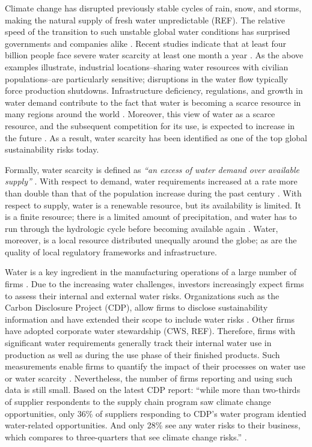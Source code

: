 \documentclass[a4paper]{article}
\begin{document}
Climate change has disrupted previously stable cycles of rain, snow, and storms, making the natural supply of fresh water unpredictable (REF). 
The relative speed of the transition to such unstable global water conditions has surprised governments and companies alike \citep{Schneider:2016}.
Recent studies indicate that at least four billion people face severe water scarcity at least one month a year \citep{Mekonnen:2016}.
As the above examples illustrate, industrial locations--sharing water resources with civilian populations--are particularly sensitive; disruptions in the water flow typically force production shutdowns.
Infrastructure deficiency, regulations, and growth in water demand contribute to the fact that water is becoming a scarce resource in many regions around the world \citep{OECD:2011, Schyns:2015}. 
Moreover, this view of water as a scarce resource, and the subsequent competition for its use, is expected to increase in the future \citep{Hoekstra:2014, WEF:2015}.
As a result, water scarcity has been identified as one of the top global sustainability risks today. 

Formally, water scarcity is defined as \textit{``an excess of water demand over available supply''} \citep[][p.xx]{Steduto:2012}.
With respect to demand, water requirements increased at a rate more than double than that of the population increase during the past century \citep{Zabarenko:2011}.
With respect to supply, water is a renewable resource, but its availability is limited. 
It is a finite resource; there is a limited amount of precipitation, and water has to run through the hydrologic cycle before becoming available again \citep{Hoekstra:2013,Schyns:2015}.
Water, moreover, is a local resource distributed unequally around the globe; as are the quality of local regulatory frameworks and infrastructure. 

Water is a key ingredient in the manufacturing operations of a large number of firms \citep{Jones:2014}. 
Due to the increasing water challenges, investors increasingly expect firms to assess their internal and external water risks. 
Organizations such as the Carbon Disclosure Project (CDP), allow firms to disclose sustainability information and have extended their scope to include water risks \citep{CDP:2015}.
Other firms have adopted corporate water stewardship (CWS, REF).
Therefore, firms with significant water requirements generally track their internal water use in production as well as during the use phase of their finished products.
Such measurements enable firms to quantify the impact of their processes on water use \citep{Hoekstra:2016} or water scarcity \citep{Pfister:2017}.
Nevertheless, the number of firms reporting and using such data is still small. 
Based on the latest CDP report: ``while more than two-thirds of supplier respondents to the supply chain program saw climate change opportunities, only 36\% of suppliers responding to CDP’s water program identied water-related opportunities. And only 28\% see any water risks to their business, which compares to three-quarters that see climate change risks.'' \citep{CDP:2017}.
\end{document}
